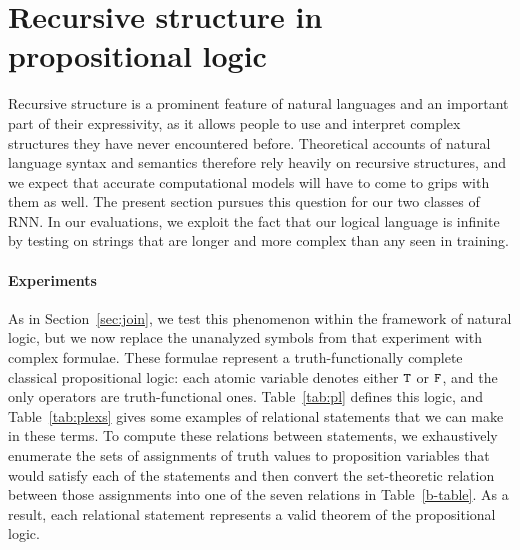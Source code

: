 \section{Recursive structure in propositional logic}\label{sec:recursion}

Recursive structure is a prominent feature of natural languages and an
important part of their expressivity, as it allows people to use and
interpret complex structures they have never encountered before.
Theoretical accounts of natural language syntax and semantics
therefore rely heavily on recursive structures, and we expect that
accurate computational models will have to come to grips with them as
well. The present section pursues this question for our two classes of
RNN. In our evaluations, we exploit the fact that our logical language
is infinite by testing on strings that are longer and more complex
than any seen in training.


\paragraph{Experiments}
As in Section~\ref{sec:join}, we test this phenomenon within the
framework of natural logic, but we now replace the unanalyzed symbols
from that experiment with complex formulae. These formulae
represent a truth-functionally complete classical propositional logic:
each atomic variable denotes either $\texttt{T}$ or $\texttt{F}$, and the only
operators are truth-functional ones.  Table~\ref{tab:pl} defines this
logic, and Table~\ref{tab:plexs} gives some examples of relational
statements that we can make in these terms. To compute these relations
between statements, we exhaustively enumerate the sets of assignments
of truth values to proposition variables that would satisfy each of
the statements and then convert the set-theoretic relation between
those assignments into one of the seven relations in
Table~\ref{b-table}. As a result, each relational statement represents
a valid theorem of the propositional logic.

